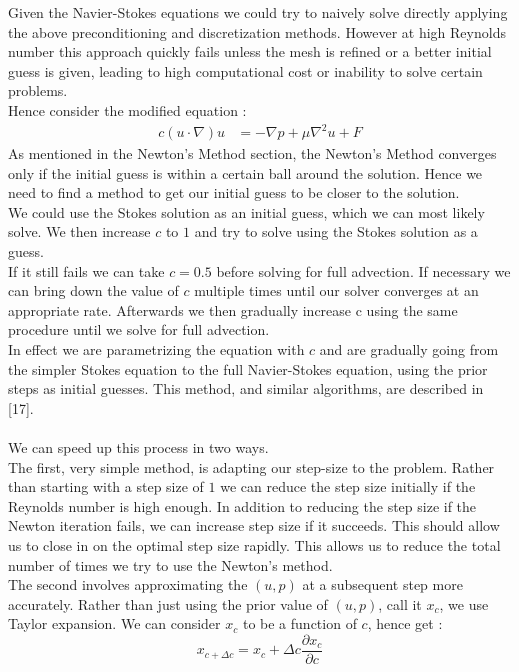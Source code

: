 \documentclass[11pt,twoside,a4paper]{article}
\begin{document}
Given the Navier-Stokes equations we could try to naively solve directly applying the above preconditioning and discretization methods. However at high Reynolds number this approach quickly fails unless the mesh is refined or a better initial guess is given, leading to high computational cost or inability to solve certain problems.\\
Hence consider the modified equation :
\begin{align}
c (u \cdot \nabla) u &= -\nabla p + \mu \nabla^2 u + F
\end{align}
As mentioned in the Newton's Method section, the Newton's Method converges only if the initial guess is within a certain ball around the solution. Hence we need to find a method to get our initial guess to be closer to the solution.\\
We could use the Stokes solution as an initial guess, which we can most likely solve. We then increase $c$ to $1$ and try to solve using the Stokes solution as a guess. \\
If it still fails we can take $c =0.5$ before solving for full advection. If necessary we can bring down the value of $c$ multiple times until our solver converges at an appropriate rate. Afterwards we then gradually increase c using the same procedure until we solve for full advection.\\
In effect we are parametrizing the equation with $c$ and are gradually going from the simpler Stokes equation to the full Navier-Stokes equation, using the prior steps as initial guesses. This method, and similar algorithms, are described in [17].\\
\\
We can speed up this process in two ways.\\
The first, very simple method, is adapting our step-size to the problem. Rather than starting with a step size of $1$ we can reduce the step size initially if the Reynolds number is high enough. In addition to reducing the step size if the Newton iteration fails, we can increase step size if it succeeds. This should allow us to close in on the optimal step size rapidly. This allows us to reduce the total number of times we try to use the Newton's method.\\
The second involves approximating the $(u,p)$ at a subsequent step more accurately. Rather than just using the prior value of $(u,p)$, call it $x_c$, we use Taylor expansion. We can consider $x_c$ to be a function of $c$, hence get :
$$
x_{c+\Delta c} = x_c + \Delta c \frac{\partial x_c}{\partial c}
$$
\end{document}
